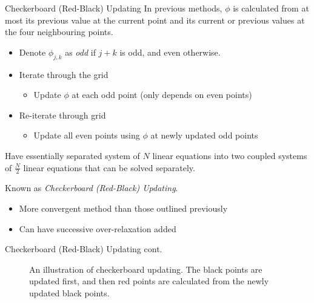 \documentclass{beamer}
\begin{document}
\begin{frame}{Checkerboard (Red-Black) Updating}
In previous methods, $\phi$ is calculated from at most its previous value at the
current point and its current or previous values at the four neighbouring points.
\begin{itemize}
\item Denote $\phi_{j,k}$ as \emph{odd} if $j+k$ is odd, and even otherwise.
\item Iterate through the grid
 \begin{itemize}
 \item Update $\phi$ at each odd point (only depends on even points)
 \end{itemize}
\item Re-iterate through grid
 \begin{itemize}
 \item Update all even points using $\phi$ at newly updated odd points
 \end{itemize}
\end{itemize}

Have essentially separated system of $N$ linear equations into two coupled systems
of $\frac{N}{2}$ linear equations that can be solved separately.

Known as \emph{Checkerboard (Red-Black) Updating}.

\begin{itemize}
\item More convergent method than those outlined previously
\item Can have successive over-relaxation added
\end{itemize}

\end{frame}

\begin{frame}{Checkerboard (Red-Black) Updating cont.}
\begin{figure}[h!]
\begin{center}
\end{center}
\caption{An illustration of checkerboard updating. The black points are updated first,
and then red points are calculated from the newly updated black points.}
\label{fig:checker}
\end{figure}

\end{frame}
\end{document}
